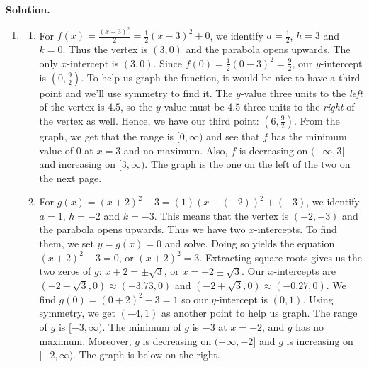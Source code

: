 \begin{ex}
\begin{enumerate}
\begin{center}
\end{center}

\end{enumerate}

\vspace*{-.15in}

\enlargethispage{.1in}

{\bf Solution.}

\begin{enumerate}

\item

\begin{enumerate}

\item For $f(x) = \frac{(x-3)^2}{2}  = \frac{1}{2} (x-3)^2+0$, we identify $a = \frac{1}{2}$, $h = 3$ and $k = 0$.  Thus the vertex is $(3,0)$ and the parabola opens upwards.  The only $x$-intercept is $(3,0)$.  Since $f(0) = \frac{1}{2} (0-3)^2 = \frac{9}{2}$, our $y$-intercept is $\left(0, \frac{9}{2}\right)$.  To help us graph the function, it would be nice to have a third point and we'll use symmetry to find it.  The $y$-value three units to the \textit{left} of the vertex is $4.5$, so the $y$-value must be $4.5$ three units to the \textit{right} of the vertex as well.  Hence, we have our third point:  $\left(6, \frac{9}{2}\right)$.  From the graph, we get that the range is $[0, \infty)$ and see that $f$ has the minimum value of $0$ at $x = 3$ and no maximum.  Also, $f$ is decreasing on $(-\infty, 3]$ and increasing on $[3, \infty)$.  The graph is the one on the left of the two on the next page.

\item For $g(x) = (x+2)^2 - 3 = (1)(x-(-2))^2+(-3)$, we identify $a = 1$, $h = -2$ and $k = -3$.  This means that the vertex is $(-2,-3)$ and the parabola opens upwards.  Thus we have two $x$-intercepts. To find them, we set $y = g(x) = 0$ and solve.  Doing so yields the equation $(x+2)^2 - 3 = 0$, or $(x+2)^2 = 3$.  Extracting square roots gives us the two zeros of $g$:  $x + 2 = \pm \sqrt{3}$, or $x = -2 \pm \sqrt{3}$.  Our $x$-intercepts are $(-2-\sqrt{3}, 0) \approx (-3.73, 0)$ and $(-2+\sqrt{3}, 0) \approx (-0.27, 0)$.  We find $g(0) = (0+2)^2-3 = 1$ so our $y$-intercept is $(0,1)$.  Using symmetry, we get $(-4,1)$ as another point to help us graph.  The range of $g$ is $[-3, \infty)$.  The minimum of $g$ is $-3$ at $x = -2$, and $g$ has no maximum. Moreover, $g$ is decreasing on $(-\infty, -2]$ and $g$ is increasing on $[-2, \infty)$.  The graph is below on the right.


\end{enumerate}
\end{enumerate}
\end{ex}

